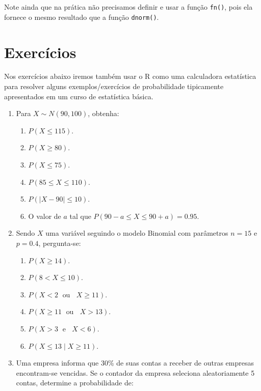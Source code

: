 \documentclass[10pt,a4paper]{book}
\providecommand{\tightlist}{%
  \setlength{\itemsep}{0pt}\setlength{\parskip}{0pt}}
\begin{document}
Note ainda que na prática não precisamos definir e usar a função
\texttt{fn()}, pois ela fornece o mesmo resultado que a função
\texttt{dnorm()}.

\section*{Exercícios}\label{exercuxedcios-17}


Nos exercícios abaixo iremos também usar o R como uma calculadora
estatística para resolver alguns exemplos/exercícios de probabilidade
tipicamente apresentados em um curso de estatística básica.

\begin{enumerate}
\def\labelenumi{\arabic{enumi}.}
\tightlist
\item
  Para \(X \sim N(90, 100)\), obtenha:

  \begin{enumerate}
  \def\labelenumii{\alph{enumii}.}
  \tightlist
  \item
    \(P(X \leq 115)\).
  \item
    \(P(X \geq 80)\).
  \item
    \(P(X \leq 75)\).
  \item
    \(P(85 \leq X \leq 110)\).
  \item
    \(P(|X - 90| \leq 10)\).
  \item
    O valor de \(a\) tal que \(P(90-a \leq X \leq 90+a) = 0.95\).
  \end{enumerate}
\item
  Sendo \(X\) uma variável seguindo o modelo Binomial com parâmetros
  \(n = 15\) e \(p = 0.4\), pergunta-se:

  \begin{enumerate}
  \def\labelenumii{\alph{enumii}.}
  \tightlist
  \item
    \(P(X \geq 14)\).
  \item
    \(P(8 < X \leq 10)\).
  \item
    \(P(X < 2 \; \mbox{ ou } \;\; X \geq 11)\).
  \item
    \(P(X \geq 11 \; \mbox{ ou } \;\; X > 13)\).
  \item
    \(P(X > 3 \; \mbox{ e } \;\; X < 6)\).
  \item
    \(P(X \leq 13 \; | \; X \geq 11)\).
  \end{enumerate}
\item
  Uma empresa informa que 30\% de suas contas a receber de outras
  empresas encontram-se vencidas. Se o contador da empresa seleciona
  aleatoriamente 5 contas, determine a probabilidade de:


\end{enumerate}
\end{document}
